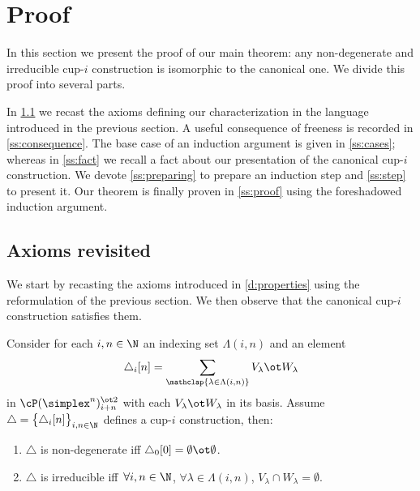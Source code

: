 
\section{Proof}\label{s:proof}

In this section we present the proof of our main theorem: any non-degenerate and irreducible \mbox{cup-$i$} construction is isomorphic to the canonical one.
We divide this proof into several parts.

In \cref{ss:properties} we recast the axioms defining our characterization in the language introduced in the previous section.
A useful consequence of freeness is recorded in \cref{ss:consequence}.
The base case of an induction argument is given in \cref{ss:cases}; whereas in
\cref{ss:fact} we recall a fact about our presentation of the canonical cup-$i$ construction.
We devote \cref{ss:preparing} to prepare an induction step and \cref{ss:step} to present it.
Our theorem is finally proven in \cref{ss:proof} using the foreshadowed induction argument.

\subsection{Axioms revisited}\label{ss:properties}

We start by recasting the axioms introduced in \cref{d:properties} using the reformulation of the previous section.
We then observe that the canonical cup-$i$ construction satisfies them.

\begin{lemma}\label{l:properties}
	Consider for each $i,n \in \N$ an indexing set $\Lambda(i,n)$ and an element
	\[
	\triangle_i [n] =
	\sum_{\mathclap{\lambda \in \Lambda(i,n)}} V_\lambda \ot W_\lambda
	\]
	in $\cP(\simplex^n)^{\ot 2}_{i+n}$ with each $V_\lambda \ot W_\lambda$ in its basis.
	Assume $\triangle = \big\{ \triangle_i [n] \big\}_{i,n \in \N}$ defines a \mbox{cup-$i$} construction, then:
	\begin{enumerate}
		\item $\triangle$ is non-degenerate iff
		$\triangle_0 [0] = \emptyset \ot \emptyset$.
		\item $\triangle$ is irreducible iff\,
		$\forall i,n \in \N$, $\forall \lambda \in \Lambda(i,n)$, $V_\lambda \cap W_\lambda = \emptyset$.
	\end{enumerate}
\end{lemma}

